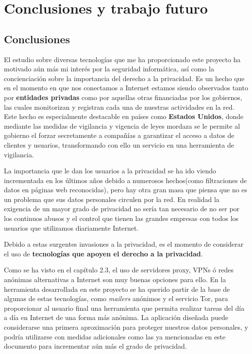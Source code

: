 \chapter{Conclusiones y trabajo futuro}
\label{chap:conclusiones}
\section{Conclusiones}
El estudio sobre diversas tecnologías que me ha proporcionado este proyecto ha motivado aún más mi interés por la seguridad informática, así como la concienciación sobre la importancia del derecho a la privacidad.
Es un hecho que en el momento en que nos conectamos a Internet estamos siendo observados tanto por \textbf{entidades privadas} como por aquellas otras financiadas por los gobiernos, las cuales monitorizan y registran cada una de nuestras actividades en la red. Este hecho es especialmente destacable en países como \textbf{Estados Unidos}, donde mediante las medidas de vigilancia y vigencia de leyes mordaza se le permite al gobierno el forzar secretamente a compañías a garantizar el acceso a datos de clientes y usuarios, transformando con ello un servicio en una herramienta de vigilancia. 

La importancia que le dan los usuarios a la privacidad se ha ido viendo incrementada en los últimos años debido a numerosos hechos(como filtraciones de datos en páginas web reconocidas), pero hay otra gran masa que piensa que no es un problema que sus datos personales circulen por la red. 
En realidad la exigencia de un mayor grado de privacidad no sería tan necesario de no ser por los continuos abusos y el control que tienen las grandes empresas con todos los usuarios que utilizamos diariamente Internet.

Debido a estas surgentes invasiones a la privacidad, es el momento de considerar el uso de \textbf{tecnologías que apoyen el derecho a la privacidad}. 

Como se ha visto en el capítulo 2.3, el uso de servidores proxy, VPNs ó redes anónimas alternativas a Internet son muy buenas opciones para ello. En la herramienta desarrollada en este proyecto se ha querido partir de la base de algunas de estas tecnologías, como \textit{mailers }anónimos y el servicio Tor, para proporcionar al usuario final una herramienta que permita realizar tareas del día a día en Internet de una forma más anónima. 
La aplicación diseñada puede considerarse una primera aproximación para proteger nuestros datos personales, y podría utilizarse con medidas adicionales como las ya mencionadas en este documento para incrementar aún más el grado de privacidad.

